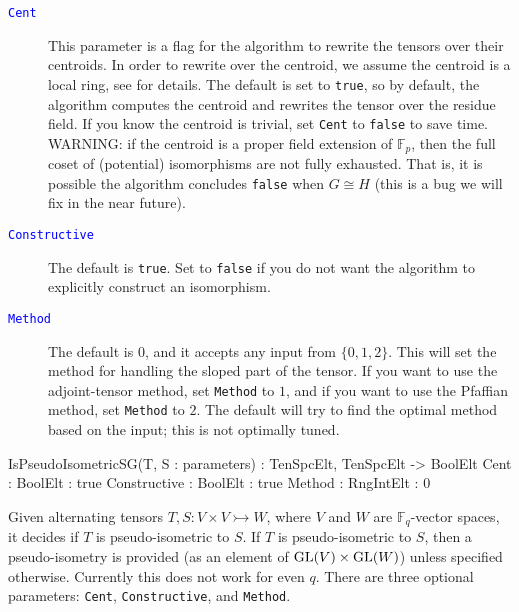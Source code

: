 \documentclass{documentation}
\DeclareMathOperator{\GL}{{\rm GL}}
\begin{document}
\begin{description}
\item[\textcolor{blue}{\tt Cent}]
This parameter is a flag for the algorithm to rewrite the tensors over their centroids. 
In order to rewrite over the centroid, we assume the centroid is a local ring, see \cite{eMAGma} for details.
The default is set to {\tt true}, so by default, the algorithm computes the centroid and rewrites the tensor over the residue field.
If you know the centroid is trivial, set {\tt Cent} to {\tt false} to save time.
WARNING: if the centroid is a proper field extension of $\mathbb{F}_p$, then the full coset of (potential) isomorphisms are not fully exhausted. 
That is, it is possible the algorithm concludes {\tt false} when $G\cong H$ (this is a bug we will fix in the near future).
\item[\textcolor{blue}{\tt Constructive}]
The default is {\tt true}. 
Set to {\tt false} if you do not want the algorithm to explicitly construct an isomorphism.
\item[\textcolor{blue}{\tt Method}]
The default is $0$, and it accepts any input from $\{ 0,1,2\}$. 
This will set the method for handling the sloped part of the tensor.
If you want to use the adjoint-tensor method, set {\tt Method} to $1$, and if you want to use the Pfaffian method, set {\tt Method} to $2$. The default will try to find the optimal method based on the input; this is not optimally tuned.
\end{description}

\begin{intrinsics}
IsPseudoIsometricSG(T, S : parameters) : TenSpcElt, TenSpcElt -> BoolElt
    Cent : BoolElt : true
    Constructive : BoolElt : true
    Method : RngIntElt : 0
\end{intrinsics}

\color{black}
Given alternating tensors $T, S : V\times V \rightarrowtail W$, where $V$ and $W$ are $\mathbb{F}_q$-vector spaces, it decides if $T$ is pseudo-isometric to $S$.
If $T$ is pseudo-isometric to $S$, then a pseudo-isometry is provided (as an element of $\GL(V)\times \GL(W)$) unless specified otherwise. 
Currently this does not work for even $q$. 
There are three optional parameters: {\tt Cent}, {\tt Constructive}, and {\tt Method}.
\end{document}
